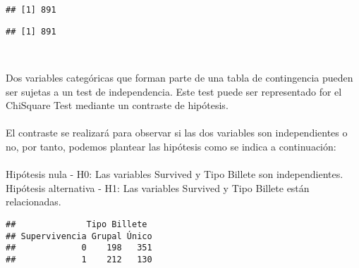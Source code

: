 \documentclass[
]{article}
\newenvironment{Shaded}{\begin{snugshade}}{\end{snugshade}}
\newcommand{\CommentTok}[1]{\textcolor[rgb]{0.56,0.35,0.01}{\textit{#1}}}
\newcommand{\DataTypeTok}[1]{\textcolor[rgb]{0.13,0.29,0.53}{#1}}
\newcommand{\KeywordTok}[1]{\textcolor[rgb]{0.13,0.29,0.53}{\textbf{#1}}}
\newcommand{\NormalTok}[1]{#1}
\newcommand{\OperatorTok}[1]{\textcolor[rgb]{0.81,0.36,0.00}{\textbf{#1}}}
\newcommand{\StringTok}[1]{\textcolor[rgb]{0.31,0.60,0.02}{#1}}
\begin{document}
\begin{verbatim}
## [1] 891
\end{verbatim}

\begin{Shaded}
\end{Shaded}

\begin{verbatim}
## [1] 891
\end{verbatim}

\texttt{}\\
\texttt{}

Dos variables categóricas que forman parte de una tabla de contingencia
pueden ser sujetas a un test de independencia. Este test puede ser
representado for el ChiSquare Test mediante un contraste de hipótesis.\\
\texttt{}~\\
El contraste se realizará para observar si las dos variables son
independientes o no, por tanto, podemos plantear las hipótesis como se
indica a continuación:\\
\texttt{}~\\
Hipótesis nula - H0: Las variables Survived y Tipo Billete son
independientes.\\
Hipótesis alternativa - H1: Las variables Survived y Tipo Billete están
relacionadas.

\texttt{}

\begin{Shaded}
\end{Shaded}

\begin{verbatim}
##              Tipo Billete
## Supervivencia Grupal Único
##             0    198   351
##             1    212   130
\end{verbatim}
\end{document}

